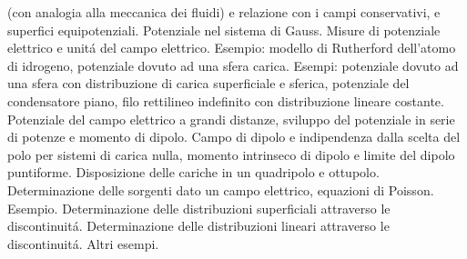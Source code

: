 \begin{multicols}{3}
  (con analogia alla meccanica dei fluidi) e relazione con i campi conservativi, e superfici equipotenziali.
  Potenziale nel sistema di Gauss. Misure di potenziale elettrico e unit\'a del campo elettrico.
  Esempio: modello di Rutherford dell'atomo di idrogeno, potenziale dovuto ad una sfera carica.
  Esempi: potenziale dovuto ad una sfera con distribuzione di carica superficiale e sferica, potenziale del condensatore piano,
  filo rettilineo indefinito con distribuzione lineare costante.
  Potenziale del campo elettrico a grandi distanze, sviluppo del potenziale in serie di potenze e momento di dipolo.
  Campo di dipolo e indipendenza dalla scelta del polo per sistemi di carica nulla, momento intrinseco di dipolo e limite del dipolo puntiforme.
  Disposizione delle cariche in un quadripolo e ottupolo. Determinazione delle sorgenti dato un campo elettrico, equazioni di Poisson.
  Esempio. Determinazione delle distribuzioni superficiali attraverso le discontinuit\'a.
  Determinazione delle distribuzioni lineari attraverso le discontinuit\'a. Altri esempi.
\end{multicols}

